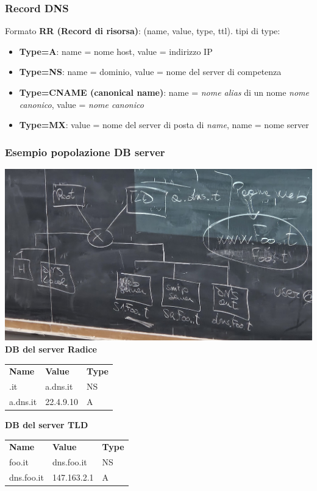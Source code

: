 \subsubsection{Record DNS}
Formato \textbf{RR (Record di risorsa)}: (name, value, type, ttl).  tipi di type:
\begin{itemize}
  \item \textbf{Type=A}: name = nome host, value = indirizzo IP
  \item \textbf{Type=NS}: name = dominio, value = nome del server di competenza
  \item \textbf{Type=CNAME (canonical name)}: name = \textit{nome alias} di un nome \textit{nome canonico}, value = \textit{nome canonico}
  \item \textbf{Type=MX}: value = nome del server di posta di \textit{name}, name = nome server
\end{itemize}

\subsubsection*{Esempio popolazione DB server}

\includegraphics[width=\textwidth]{./img/dbdns.jpg} \\

\bigskip
\textbf{DB del server Radice} \newline
\begin{tabular}{lll}
\textbf{Name} & \textbf{Value} & \textbf{Type} \\
.it           & a.dns.it       & NS            \\
a.dns.it      & 22.4.9.10      & A             
\end{tabular}

\bigskip
\textbf{DB del server TLD} \newline
\begin{tabular}{lll}
\textbf{Name} & \textbf{Value}     & \textbf{Type} \\
foo.it        & dns.foo.it         & NS            \\
dns.foo.it    & 147.163.2.1        & A             
\end{tabular}

